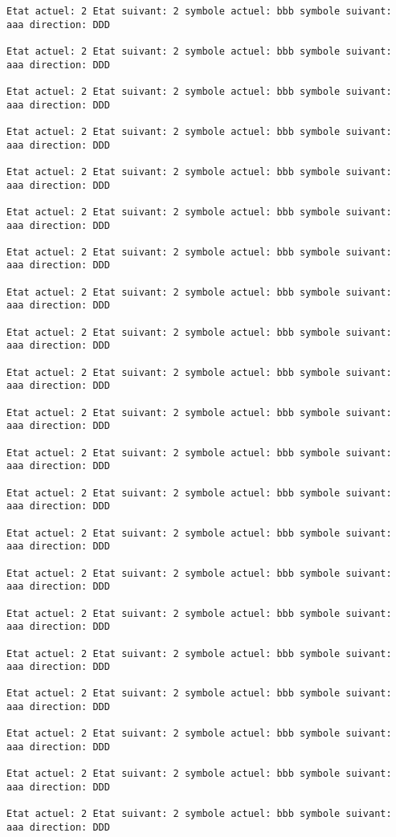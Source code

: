 \documentclass{article}
\begin{document}
\begin{verbatim}
Etat actuel: 2 Etat suivant: 2 symbole actuel: bbb symbole suivant: aaa direction: DDD

Etat actuel: 2 Etat suivant: 2 symbole actuel: bbb symbole suivant: aaa direction: DDD

Etat actuel: 2 Etat suivant: 2 symbole actuel: bbb symbole suivant: aaa direction: DDD

Etat actuel: 2 Etat suivant: 2 symbole actuel: bbb symbole suivant: aaa direction: DDD

Etat actuel: 2 Etat suivant: 2 symbole actuel: bbb symbole suivant: aaa direction: DDD

Etat actuel: 2 Etat suivant: 2 symbole actuel: bbb symbole suivant: aaa direction: DDD

Etat actuel: 2 Etat suivant: 2 symbole actuel: bbb symbole suivant: aaa direction: DDD

Etat actuel: 2 Etat suivant: 2 symbole actuel: bbb symbole suivant: aaa direction: DDD

Etat actuel: 2 Etat suivant: 2 symbole actuel: bbb symbole suivant: aaa direction: DDD

Etat actuel: 2 Etat suivant: 2 symbole actuel: bbb symbole suivant: aaa direction: DDD

Etat actuel: 2 Etat suivant: 2 symbole actuel: bbb symbole suivant: aaa direction: DDD

Etat actuel: 2 Etat suivant: 2 symbole actuel: bbb symbole suivant: aaa direction: DDD

Etat actuel: 2 Etat suivant: 2 symbole actuel: bbb symbole suivant: aaa direction: DDD

Etat actuel: 2 Etat suivant: 2 symbole actuel: bbb symbole suivant: aaa direction: DDD

Etat actuel: 2 Etat suivant: 2 symbole actuel: bbb symbole suivant: aaa direction: DDD

Etat actuel: 2 Etat suivant: 2 symbole actuel: bbb symbole suivant: aaa direction: DDD

Etat actuel: 2 Etat suivant: 2 symbole actuel: bbb symbole suivant: aaa direction: DDD

Etat actuel: 2 Etat suivant: 2 symbole actuel: bbb symbole suivant: aaa direction: DDD

Etat actuel: 2 Etat suivant: 2 symbole actuel: bbb symbole suivant: aaa direction: DDD

Etat actuel: 2 Etat suivant: 2 symbole actuel: bbb symbole suivant: aaa direction: DDD

Etat actuel: 2 Etat suivant: 2 symbole actuel: bbb symbole suivant: aaa direction: DDD


\end{verbatim}
\end{document}
